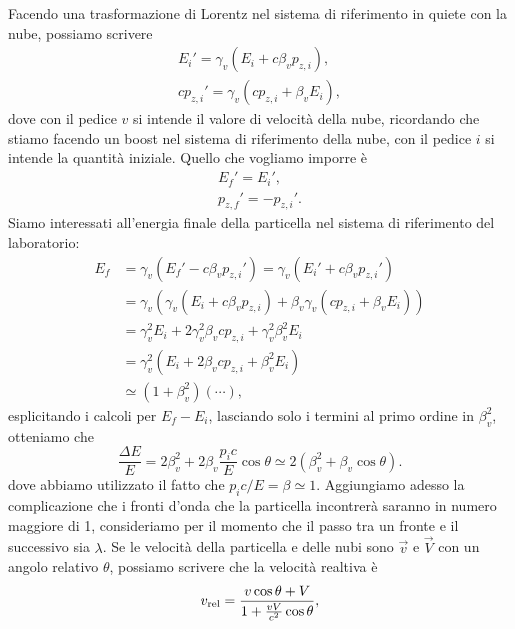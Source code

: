 Facendo una trasformazione di Lorentz nel sistema di riferimento in quiete con la nube, possiamo scrivere
\begin{gather*}
    E_i' = \gamma_v (E_i + c\beta_v p_{z, i}),\\
    cp_{z, i}' = \gamma_v (cp_{z, i} + \beta_v E_i),
\end{gather*}
dove con il pedice $v$ si intende il valore di velocità della nube, ricordando che stiamo facendo un boost nel sistema di riferimento della nube, con il pedice $i$ si intende la quantità iniziale. Quello che vogliamo imporre è
\begin{gather*}
    E_f' = E_i',\\
    p_{z, f}' = - p_{z, i}'.
\end{gather*}
Siamo interessati all'energia finale della particella nel sistema di riferimento del laboratorio:
\begin{equation*}
    \begin{split}
        E_{f} & = \gamma_v (E_{f}' - c\beta_v p_{z,i}') = \gamma_v (E_i' + c\beta_v p_{z,i}')\\
              & = \gamma_v (\gamma_v (E_i + c\beta_v p_{z,i}) + \beta_v \gamma_v (cp_{z, i} + \beta_v E_i))\\
              & = \gamma_v^2 E_i + 2 \gamma_v^2 \beta_v c p_{z, i} + \gamma_v^2 \beta_v^2 E_i \\
              & = \gamma_v^2 (E_i + 2 \beta_v c p_{z, i} + \beta_v^2 E_i) \\
              & \simeq (1+\beta_v^2 ) (\cdots),
    \end{split}
\end{equation*}
esplicitando i calcoli per $E_f - E_i$, lasciando solo i termini al primo ordine in $\beta_v^2$, otteniamo che
\begin{equation}
    \frac{\Delta E}{E} = 2 \beta_v^2 + 2 \beta_v \frac{p_ic}{E}\cos \theta \simeq 2 (\beta_v^2 + \beta_v \cos \theta). \label{eq:betavcoshtheta}
\end{equation}
dove abbiamo utilizzato il fatto che $p_i c / E = \beta \simeq 1$. Aggiungiamo adesso la complicazione che i fronti d'onda che la particella incontrerà saranno in numero maggiore di 1, consideriamo per il momento che il passo tra un fronte e il successivo sia $\lambda$. Se le velocità della particella e delle nubi sono $\vec{v}$ e $\vec{V}$ con un angolo relativo $\theta$, possiamo scrivere che la velocità realtiva è
\begin{equation*}
    v_\textup{rel} = \frac{v\cos \theta + V}{1 + \frac{vV}{c^2}\cos \theta},
\end{equation*}
